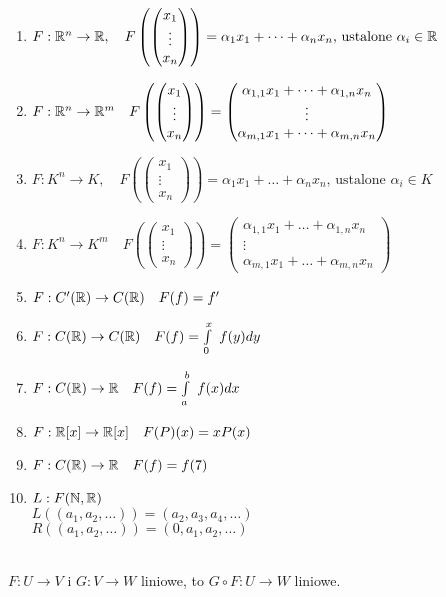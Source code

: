 \begin{przy}
    \hfill
    \begin{enumerate}[{(}1{)}]
        \item $F: \mathbb{R}^n \rightarrow \mathbb{R}, \quad F \left( \begin{pmatrix} x_1 \\ \vdots \\ x_n \end{pmatrix}\right) = \alpha_1 x_1 + \dots + \alpha_n x_n \text{, ustalone } \alpha_i \in \mathbb{R}$ 
        \item $F: \mathbb{R}^n \rightarrow \mathbb{R}^m  \quad F \left( \begin{pmatrix} x_1 \\ \vdots \\ x_n \end{pmatrix}\right) = \begin{pmatrix} \alpha_{1,1}x_1 + \dots + \alpha_{1,n} x_n\\ \vdots \\ \alpha_{m,1}x_1 + \dots + \alpha_{m,n} x_n \end{pmatrix}$
        \item $F: K^n \rightarrow K, \quad F \left( \begin{pmatrix} x_1 \\ \vdots \\ x_n \end{pmatrix}\right) = \alpha_1 x_1 + \dots + \alpha_n x_n \text{, ustalone } \alpha_i \in K$ 
        \item $F: K^n \rightarrow K^m  \quad F \left( \begin{pmatrix} x_1 \\ \vdots \\ x_n \end{pmatrix}\right) = \begin{pmatrix} \alpha_{1,1}x_1 + \dots + \alpha_{1,n} x_n\\ \vdots \\ \alpha_{m,1}x_1 + \dots + \alpha_{m,n} x_n \end{pmatrix}$
        \item $F : C'(\mathbb{R}) \rightarrow C(\mathbb{R}) \quad F(f) = f'$ 
        \item $F: C(\mathbb{R}) \rightarrow C(\mathbb{R}) \quad F(f) = \int\limits_0^x \ f(y) dy$ 
        \item $F: C(\mathbb{R}) \rightarrow \mathbb{R} \quad F(f) = \int\limits_a^b \ f(x) dx$ 
        \item $F: \mathbb{R} [x] \rightarrow \mathbb{R}[x] \quad F(P)(x) = xP(x)$
        \item $F: C(\mathbb{R}) \rightarrow \mathbb{R} \quad F(f) =f(7)$
        \item $L: F(\mathbb{N},\mathbb{R})  $ \\ %
        $L((a_1,a_2,\dots)) = (a_2,a_3,a_4,\dots)$ \\
        $R((a_1,a_2,\dots)) = (0,a_1,a_2,\dots)$ 
    \end{enumerate}
\end{przy}
\begin{ft} \hfill 
    \\
    $F: U \rightarrow V $ i $G: V \rightarrow W$ liniowe, to $G \circ F: U \rightarrow W $ liniowe. 
\end{ft}


